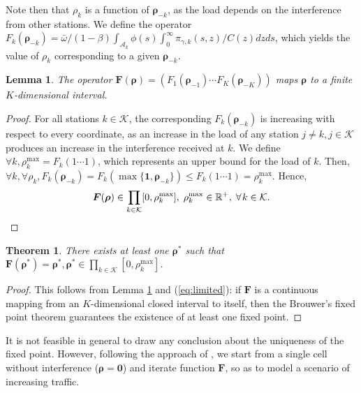 \documentclass[draftcls,onecolumn]{IEEEtran}
\theoremstyle{plain}
\newtheorem{lemma}{Lemma}
\newtheorem{theorem}{Theorem}
\theoremstyle{definition}
\begin{document}
Note then that $\rho_k$ is a function of $\boldsymbol{\rho}_{-k}$, as the load depends on the interference from other stations. 
We define the operator $F_k(\boldsymbol{\rho}_{-k})=\bar{\omega}/(1-\beta)  \int_{\mathcal{A}_k} \phi(s)  \int_{0}^{\infty}\pi_{\gamma,k}(s,z)/C(z){dz}{ds}$, which yields the value of $\rho_k$ corresponding to a given $\boldsymbol{\rho}_{-k}$.

\begin{lemma} \label{lm:finite}
The operator $\boldsymbol{F}(\boldsymbol{\rho})=(F_1(\boldsymbol{\rho}_{-1}) \cdots F_{K}(\boldsymbol{\rho}_{-K})  )$ maps $\boldsymbol{\rho}$ to a finite $K$-dimensional interval.
\end{lemma}
\begin{proof}
For all stations $k \in \mathcal{K}$, the corresponding $F_k(\boldsymbol{\rho}_{-k}) $ is increasing with respect to every coordinate, as an increase in the load of any station $j\neq k, j\in \mathcal{K}$ produces an increase in the interference received at $k$.
We define $\forall k, \rho_k^{\max}=F_k(1 \cdots 1)$, which represents an upper bound for the load of $k$. Then, $\forall k, \forall \rho_k, F_k(\boldsymbol{\rho}_{-k})=F_k(\max\{ \boldsymbol{1} , \boldsymbol{\rho}_{-k} \})\leq F_k(1 \cdots 1)=\rho_k^{\max}$.
Hence, 
\begin{equation}\label{eq:limited}
 \boldsymbol{F}( \boldsymbol{\rho}) \in \prod_{k\in \mathcal{K}} [0 , \rho_k^{\max}], \;\rho_k^{\max}\in \mathbb{R}^+, \;\forall \hspace{1 pt} k \in \mathcal{K}.
\end{equation} 
\end{proof}
\begin{theorem}
There exists at least one $\boldsymbol{\rho}^*$ such that $\boldsymbol{F}(\boldsymbol{\rho}^*)=\boldsymbol{\rho}^*, \boldsymbol{\rho}^* \in \prod_{k\in \mathcal{K}} [0 , \rho_k^{\max}]$.
\end{theorem}
\begin{proof}
This follows from Lemma \ref{lm:finite} and (\ref{eq:limited}): if $\boldsymbol{F}$ is a continuous mapping from an $K$-dimensional closed interval to itself, then the Brouwer's fixed point theorem guarantees the existence of at least one fixed point.
\end{proof}

It is not feasible in general to draw any conclusion about the uniqueness of the fixed point. However, following the approach of \cite{Rong11}, we start from a single cell without interference ($\boldsymbol{\rho}=\boldsymbol{0}$) and iterate function $\boldsymbol{F}$, so as to model a scenario of increasing traffic.  
\end{document}
